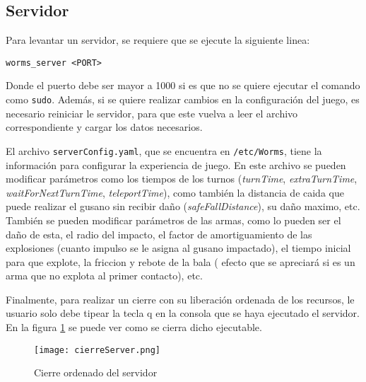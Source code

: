 \subsection{Servidor}

Para levantar un servidor, se requiere que se ejecute la siguiente linea:

\begin{lstlisting}[frame=single, caption=Instalación de dependencias, label=code:openServer]
	worms_server <PORT>
\end{lstlisting}

Donde el puerto debe ser mayor a 1000 si es que no se quiere ejecutar el comando como \texttt{sudo}. Además, si se quiere realizar cambios en la configuración del juego, es necesario reiniciar le servidor, para que este vuelva a leer el archivo correspondiente y cargar los datos necesarios. 

El archivo \texttt{serverConfig.yaml}, que se encuentra en \texttt{/etc/Worms}, tiene la información para configurar la experiencia de juego. En este archivo se pueden modificar parámetros como los tiempos de los turnos (\emph{turnTime}, \emph{extraTurnTime}, \emph{waitForNextTurnTime}, \emph{teleportTime}), como también la distancia de caida que puede realizar el gusano sin recibir daño (\emph{safeFallDistance}), su daño maximo, etc. También se pueden modificar parámetros de las armas, como lo pueden ser el daño de esta, el radio del impacto, el factor de amortiguamiento de las explosiones (cuanto impulso se le asigna al gusano impactado), el tiempo inicial para que explote, la friccion y rebote de la bala ( efecto que se apreciará si es un arma que no explota al primer contacto), etc.

Finalmente, para realizar un cierre con su liberación ordenada de los recursos, le usuario solo debe tipear la tecla q en la consola que se haya ejecutado el servidor. En la figura \ref{im:cierreS} se puede ver como se cierra dicho ejecutable.

\begin{figure}[H]
	\centering
	\texttt{[image: cierreServer.png]}
	\caption{Cierre ordenado del servidor}
	\label{im:cierreS}
\end{figure}


